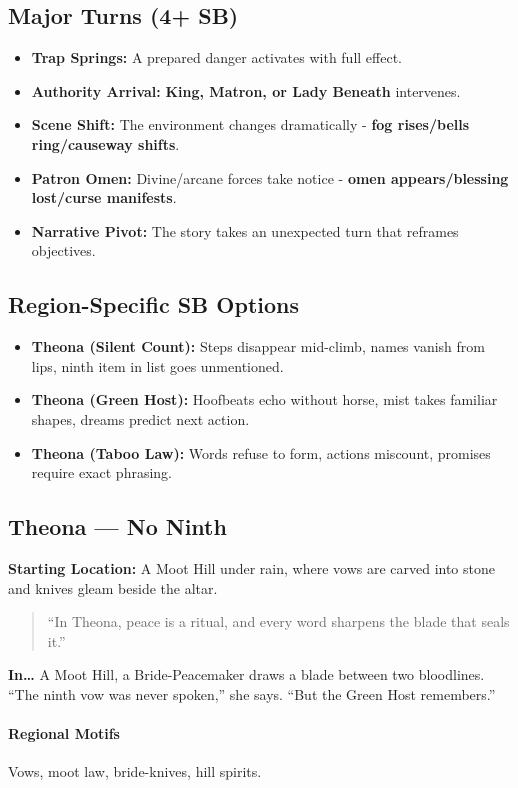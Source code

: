 \subsection*{Major Turns (4+ SB)}
\begin{itemize}
\item \textbf{Trap Springs:} A prepared danger activates with full effect.
\item \textbf{Authority Arrival:} \textbf{King, Matron, or Lady Beneath} intervenes.
\item \textbf{Scene Shift:} The environment changes dramatically - \textbf{fog rises/bells ring/causeway shifts}.
\item \textbf{Patron Omen:} Divine/arcane forces take notice - \textbf{omen appears/blessing lost/curse manifests}.
\item \textbf{Narrative Pivot:} The story takes an unexpected turn that reframes objectives.
\end{itemize}

\subsection*{Region-Specific SB Options}
\begin{itemize}
\item \textbf{Theona (Silent Count):} Steps disappear mid-climb, names vanish from lips, ninth item in list goes unmentioned.
\item \textbf{Theona (Green Host):} Hoofbeats echo without horse, mist takes familiar shapes, dreams predict next action.
\item \textbf{Theona (Taboo Law):} Words refuse to form, actions miscount, promises require exact phrasing.
\end{itemize}


\subsection*{Theona — No Ninth}
\textbf{Starting Location:} A Moot Hill under rain, where vows are carved into stone and knives gleam beside the altar.
\begin{quote}
“In Theona, peace is a ritual, and every word sharpens the blade that seals it.”
\end{quote}

\textbf{In…} A Moot Hill, a Bride-Peacemaker draws a blade between two bloodlines. ``The ninth vow was never spoken,'' she says. ``But the Green Host remembers.''
\paragraph{Regional Motifs} Vows, moot law, bride-knives, hill spirits.
